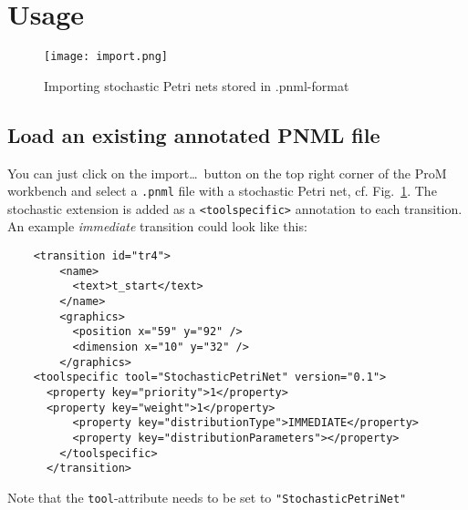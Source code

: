 \pagebreak
\chapter*{Usage}

\begin{figure}[H]
\centering
\texttt{[image: import.png]}
\caption{Importing stochastic Petri nets stored in .pnml-format}
\label{fig:import_dialog}
\end{figure}

\section*{Load an existing annotated PNML file}
You can just click on the import\ldots~button on the top right corner of the ProM workbench and select a \texttt{.pnml} file with a stochastic Petri net, cf. Fig.~\ref{fig:import_dialog}.
The stochastic extension is added as a \texttt{<toolspecific>} annotation to each transition. An example \emph{immediate} transition could look like this:

\lstset{language=XML}
\begin{lstlisting}
    <transition id="tr4">
        <name>
          <text>t_start</text>
        </name>
        <graphics>
          <position x="59" y="92" />
          <dimension x="10" y="32" />
        </graphics>
	<toolspecific tool="StochasticPetriNet" version="0.1">
	  <property key="priority">1</property>
	  <property key="weight">1</property>
      	  <property key="distributionType">IMMEDIATE</property>
          <property key="distributionParameters"></property>
        </toolspecific>
      </transition>
\end{lstlisting}
Note that the \texttt{tool}-attribute needs to be set to \texttt{"StochasticPetriNet"}
 
